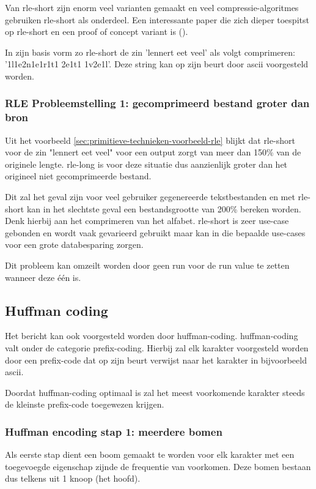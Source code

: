 Van \gls{rle-short} zijn enorm veel varianten gemaakt en veel \glspl{compressie-algoritme} gebruiken \gls{rle-short} als onderdeel. Een interessante paper die zich dieper toespitst op \gls{rle-short} en een proof of concept variant is  (\cite{rleimproved}). 

In zijn basis vorm zo \gls{rle-short} de zin 'lennert eet veel' als volgt comprimeren: 
'1l1e2n1e1r1t1 2e1t1 1v2e1l'. Deze string kan op zijn beurt door \gls{ascii} voorgesteld worden.

\subsubsection{RLE Probleemstelling 1: gecomprimeerd bestand groter dan bron}
\label{sec:primitieve-technieken-voorbeeld-rle-probleem-1}
Uit het voorbeeld \ref{sec:primitieve-technieken-voorbeeld-rle} blijkt dat \gls{rle-short} voor de zin "lennert eet veel" voor een output zorgt van meer dan 150\% van de originele lengte. \Gls{rle-long} is voor deze situatie dus aanzienlijk groter dan het origineel niet gecomprimeerde bestand. 

Dit zal het geval zijn voor veel gebruiker gegenereerde tekstbestanden en met \gls{rle-short} kan in het slechtste geval een bestandsgrootte van 200\% bereken worden. Denk hierbij aan het comprimeren van het alfabet. \Gls{rle-short} is zeer \gls{use-case} gebonden en wordt vaak gevarieerd gebruikt maar kan in die bepaalde \glspl{use-case} voor een grote databesparing zorgen.

Dit probleem kan omzeilt worden door geen run voor de run value te zetten wanneer deze één is. 

\subsection{Huffman coding}
\label{sec:primitieve-technieken-voorbeeld-huffman-encoding}
Het bericht kan ook voorgesteld worden door \gls{huffman-coding}. \gls{huffman-coding} valt onder de categorie \gls{prefix-coding}. Hierbij zal elk karakter voorgesteld worden door een \gls{prefix-code} dat op zijn beurt verwijst naar het karakter in bijvoorbeeld \gls{ascii}. 

Doordat \gls{huffman-coding} optimaal is zal het meest voorkomende karakter steeds de kleinste \gls{prefix-code} toegewezen krijgen.

\subsubsection{Huffman encoding stap 1: meerdere bomen}
\label{sec:primitieve-technieken-voorbeeld-huffman-encoding-1}
Als eerste stap dient een boom gemaakt te worden voor elk karakter met een toegevoegde eigenschap zijnde de frequentie van voorkomen. Deze bomen bestaan dus telkens uit 1 knoop (het hoofd).

